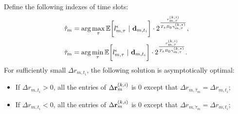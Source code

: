 \begin{lemma}
    \label{lemma:local_rate_opt}
    Define the following indexes of time slots:
     \begin{align}
        \hat{\tau}_{m} &= \arg\max_{\tau} \mathbb{E}\bigg[ l_{m,\tau}^{\epsilon}~|~\mathbf{d}_{m,t_i} \bigg]
                          \cdot 2^{\frac{r^{(k,i)}_{m,\tau}}{T_s B_0 \gamma^{(k,*)}_{m,\tau}}},
        \\
        \breve{\tau}_{m} &= \arg\min_{\tau} \mathbb{E}\bigg[ l_{m,\tau}^{\epsilon}~|~\mathbf{d}_{m,t_i} \bigg]
                          \cdot 2^{\frac{r^{(k,i)}_{m,\tau}}{T_s B_0 \gamma^{(k,*)}_{m,\tau}}}.
    \end{align}   
    For sufficiently small $\Delta{r}_{m,t_i}$, the following solution is asymptotically optimal:
    \begin{itemize}
        \item If $\Delta{r}_{m,t_i} > 0$, all the entries of $\Delta{{\mathbf{r}}^{(k,i)}_{m}}$ is $0$ except that $\Delta{r}_{m,\hat{\tau}_{m}} = \Delta{r}_{m,t_i}$;
        \item If $\Delta{r}_{m,t_i} < 0$, all the entries of $\Delta{{\mathbf{r}}^{(k,i)}_{m}}$ is $0$ except that $\Delta{r}_{m,\breve{\tau}_{m}} = \Delta{r}_{m,t_i}$;
    \end{itemize}
\end{lemma}
